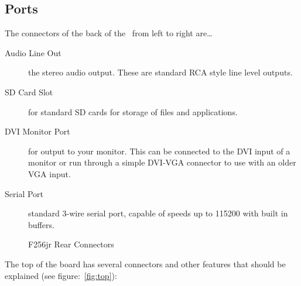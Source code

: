 \subsection*{Ports}

The connectors of the back of the \foenix\ from left to right are\dots

\begin{description}
    \item[Audio Line Out] the stereo audio output. These are standard RCA style line level outputs.

    \item[SD Card Slot] for standard SD cards for storage of files and applications.

    \item[DVI Monitor Port] for output to your monitor. This can be connected to the DVI input of a monitor or run through a simple DVI-VGA connector to use with an older VGA input.

    \item[Serial Port] standard 3-wire serial port, capable of speeds
      up to 115200 with built in buffers.
\end{description}

\begin{figure}[ht]
    \begin{center}
    \end{center}
    \caption{F256jr Rear Connectors}
    \label{fig:rear}
\end{figure}

The top of the board has several connectors and other features that should be explained (see figure:~\ref{fig:top}):

